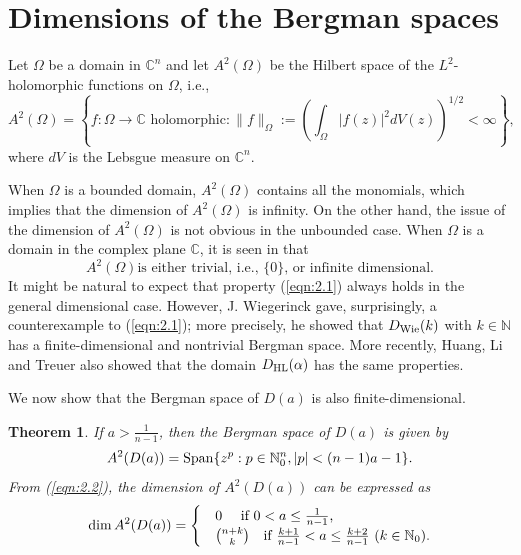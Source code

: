 \documentclass[12pt]{amsart}
\numberwithin{equation}{section}
\newtheorem{theorem}{Theorem}[section]
\theoremstyle{definition}
\theoremstyle{remark}
\newcommand{\C}{{\mathbb C}}
\newcommand{\N}{{\mathbb N}}
\newcommand{\1}{{\bf 1}}
\begin{document}
\section{Dimensions of the Bergman spaces}

Let $\Omega$ be a domain in $\C^n$ and 
let $A^2(\Omega)$ be the Hilbert space 
of the $L^2$-holomorphic functions on $\Omega$, i.e., 
$$
A^2(\Omega)=
\left\{
f:\Omega\to\C \mbox{ holomorphic}:
\|f\|_{\Omega}:=
\left(
\int_{\Omega} |f(z)|^2 dV(z)
\right)^{1/2}<\infty
\right\},
$$
where $dV$ is the Lebsgue measure on $\C^n$.
%

When $\Omega$ is a bounded domain, 
$A^2(\Omega)$ contains all the monomials, 
which implies that 
the dimension of $A^2(\Omega)$ is infinity. 
On the other hand,  
the issue of the dimension of 
$A^2(\Omega)$ is not obvious in the unbounded case. 
When $\Omega$ is a domain in the complex plane $\C$, 
it is seen in \cite{Wie84} that 
\begin{equation}\label{eqn:2.1}
\text{$A^2(\Omega)$
is either trivial, i.e., $\{0\}$,  or infinite dimensional.}
\end{equation}
It might be natural to expect that 
property (\ref{eqn:2.1}) always holds
in the general dimensional case. 
However, J. Wiegerinck \cite{Wie84} 
gave, surprisingly, a counterexample to 
(\ref{eqn:2.1}); more precisely,  he showed that
$D_{\rm Wie}(k)$ with $k\in\N$ 
has a finite-dimensional 
and nontrivial Bergman space.
More recently, 
Huang, Li and Treuer \cite{HLT25} also showed that 
the domain $D_{\rm HL}(\alpha)$ has the same properties. 


We now show that the Bergman space of 
$D(a)$ is also finite-dimensional. 


\begin{theorem}
If $a>\frac{1}{n-1}$, then 
the Bergman space of $D(a)$ is given by
\begin{equation}\label{eqn:2.2}
A^2(D(a))={\rm Span}\{z^p:
p\in\N_0^n, 
|p|<(n-1)a-1\}.
\end{equation}
From (\ref{eqn:2.2}), the dimension of $A^2(D(a))$ 
can be expressed as 
\begin{equation}
\dim A^2(D(a))=
\begin{cases} 
&0 \quad  \mbox{ if  $ 0<a\leq \frac{1}{n-1}$,} \\
&\binom{n+k}{k} \quad
\mbox{if  $\frac{k+1}{n-1}<a\leq 
\frac{k+2}{n-1}$ 
 $(k\in\N_0)$}.
\end{cases}
\end{equation}
\end{theorem}
\end{document}
